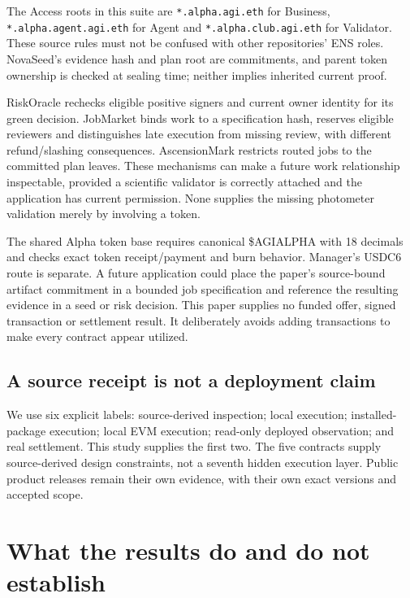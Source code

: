 \documentclass[11pt]{article}
\newcommand{\code}[1]{\texttt{#1}}
\begin{document}
The Access roots in this suite are \code{*.alpha.agi.eth} for Business, \code{*.alpha.agent.agi.eth} for Agent and \code{*.alpha.club.agi.eth} for Validator. These source rules must not be confused with other repositories' ENS roles. NovaSeed's evidence hash and plan root are commitments, and parent token ownership is checked at sealing time; neither implies inherited current proof.

RiskOracle rechecks eligible positive signers and current owner identity for its green decision. JobMarket binds work to a specification hash, reserves eligible reviewers and distinguishes late execution from missing review, with different refund/slashing consequences. AscensionMark restricts routed jobs to the committed plan leaves. These mechanisms can make a future work relationship inspectable, provided a scientific validator is correctly attached and the application has current permission. None supplies the missing photometer validation merely by involving a token.

The shared Alpha token base requires canonical \$AGIALPHA with 18 decimals and checks exact token receipt/payment and burn behavior. Manager's USDC6 route is separate. A future application could place the paper's source-bound artifact commitment in a bounded job specification and reference the resulting evidence in a seed or risk decision. This paper supplies no funded offer, signed transaction or settlement result. It deliberately avoids adding transactions to make every contract appear utilized.

\subsection{A source receipt is not a deployment claim}

We use six explicit labels: source-derived inspection; local execution; installed-package execution; local EVM execution; read-only deployed observation; and real settlement. This study supplies the first two. The five contracts supply source-derived design constraints, not a seventh hidden execution layer. Public product releases remain their own evidence, with their own exact versions and accepted scope.



\section{What the results do and do not establish}
\label{sec:discussion}
\end{document}
